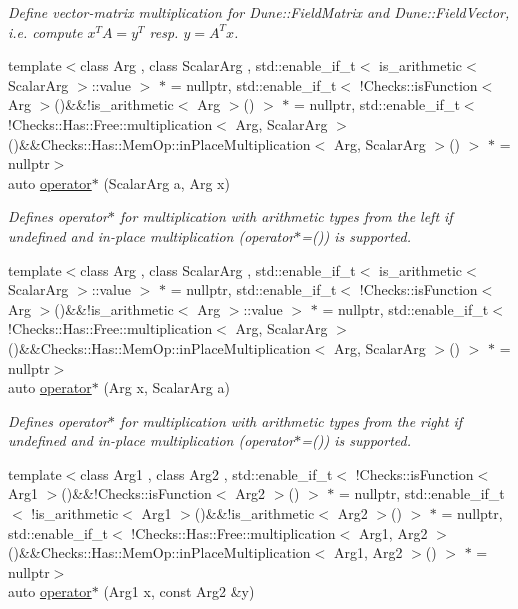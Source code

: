 \begin{DoxyCompactItemize}
\begin{DoxyCompactList}\small\item\em \-Define vector-\/matrix multiplication for \-Dune\-::\-Field\-Matrix and \-Dune\-::\-Field\-Vector, i.\-e. compute $x^T A = y^T$ resp. $y=A^T x$. \end{DoxyCompactList}\item 
{\footnotesize template$<$class Arg , class Scalar\-Arg , std\-::enable\-\_\-if\-\_\-t$<$ is\-\_\-arithmetic$<$ Scalar\-Arg $>$\-::value $>$ $\ast$  = nullptr, std\-::enable\-\_\-if\-\_\-t$<$ !\-Checks\-::is\-Function$<$ Arg $>$()\&\&!is\-\_\-arithmetic$<$ Arg $>$() $>$ $\ast$  = nullptr, std\-::enable\-\_\-if\-\_\-t$<$ !\-Checks\-::\-Has\-::\-Free\-::multiplication$<$ Arg, Scalar\-Arg $>$()\&\&\-Checks\-::\-Has\-::\-Mem\-Op\-::in\-Place\-Multiplication$<$ Arg, Scalar\-Arg $>$() $>$ $\ast$  = nullptr$>$ }\\auto \hyperlink{namespaceFunG_a9b303ce8718a6f64b035e7e782370734}{operator$\ast$} (\-Scalar\-Arg a, \-Arg x)
\begin{DoxyCompactList}\small\item\em \-Defines operator$\ast$ for multiplication with arithmetic types from the left if undefined and in-\/place multiplication (operator$\ast$=()) is supported. \end{DoxyCompactList}\item 
{\footnotesize template$<$class Arg , class Scalar\-Arg , std\-::enable\-\_\-if\-\_\-t$<$ is\-\_\-arithmetic$<$ Scalar\-Arg $>$\-::value $>$ $\ast$  = nullptr, std\-::enable\-\_\-if\-\_\-t$<$ !\-Checks\-::is\-Function$<$ Arg $>$()\&\&!is\-\_\-arithmetic$<$ Arg $>$\-::value $>$ $\ast$  = nullptr, std\-::enable\-\_\-if\-\_\-t$<$ !\-Checks\-::\-Has\-::\-Free\-::multiplication$<$ Arg, Scalar\-Arg $>$()\&\&\-Checks\-::\-Has\-::\-Mem\-Op\-::in\-Place\-Multiplication$<$ Arg, Scalar\-Arg $>$() $>$ $\ast$  = nullptr$>$ }\\auto \hyperlink{namespaceFunG_a3cd5a2cb1abba842154691bb84aab896}{operator$\ast$} (\-Arg x, \-Scalar\-Arg a)
\begin{DoxyCompactList}\small\item\em \-Defines operator$\ast$ for multiplication with arithmetic types from the right if undefined and in-\/place multiplication (operator$\ast$=()) is supported. \end{DoxyCompactList}\item 
{\footnotesize template$<$class Arg1 , class Arg2 , std\-::enable\-\_\-if\-\_\-t$<$ !\-Checks\-::is\-Function$<$ Arg1 $>$()\&\&!\-Checks\-::is\-Function$<$ Arg2 $>$() $>$ $\ast$  = nullptr, std\-::enable\-\_\-if\-\_\-t$<$ !is\-\_\-arithmetic$<$ Arg1 $>$()\&\&!is\-\_\-arithmetic$<$ Arg2 $>$() $>$ $\ast$  = nullptr, std\-::enable\-\_\-if\-\_\-t$<$ !\-Checks\-::\-Has\-::\-Free\-::multiplication$<$ Arg1, Arg2 $>$()\&\&\-Checks\-::\-Has\-::\-Mem\-Op\-::in\-Place\-Multiplication$<$ Arg1, Arg2 $>$() $>$ $\ast$  = nullptr$>$ }\\auto \hyperlink{namespaceFunG_ad023f2d2273af693f2b4ebceeb296dc8}{operator$\ast$} (\-Arg1 x, const \-Arg2 \&y)

\end{DoxyCompactItemize}
